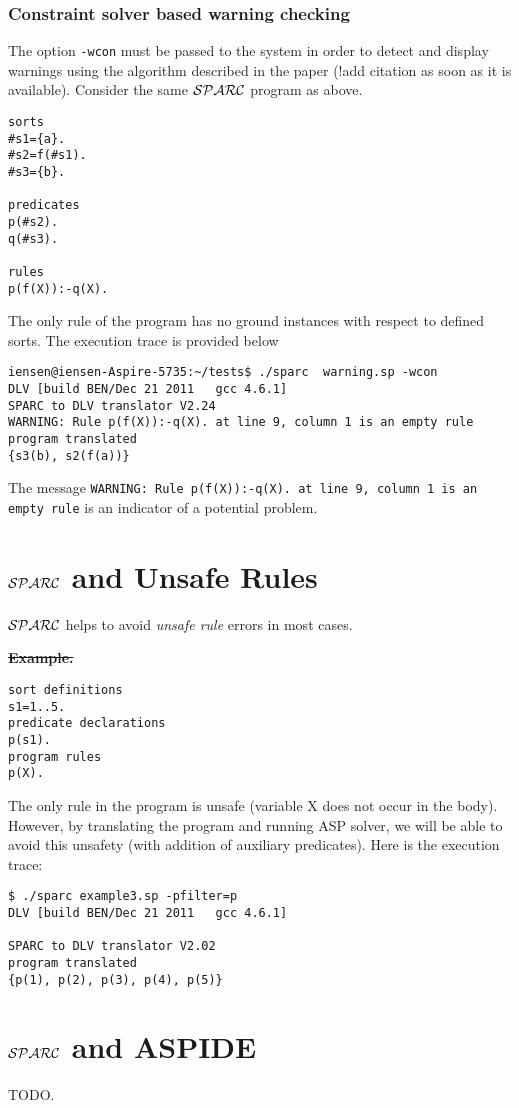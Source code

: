 \documentclass[12pt, letterpaper]{article}
\begin{document}
\subsubsection{Constraint solver based warning checking}

The option \texttt{-wcon} must be passed to the  system  in order to detect and display warnings using the algorithm described in the paper \cite{?} (!add citation as soon as it is available).
Consider the same ${\cal SPARC}$ program as above.

\begin{verbatim}
sorts
#s1={a}.
#s2=f(#s1).
#s3={b}.

predicates
p(#s2).
q(#s3).

rules
p(f(X)):-q(X).
\end{verbatim}

The only rule of the program has no ground instances with respect to defined sorts.
The execution trace is provided below
\begin{verbatim}
iensen@iensen-Aspire-5735:~/tests$ ./sparc  warning.sp -wcon
DLV [build BEN/Dec 21 2011   gcc 4.6.1]
SPARC to DLV translator V2.24
WARNING: Rule p(f(X)):-q(X). at line 9, column 1 is an empty rule
program translated
{s3(b), s2(f(a))}
\end{verbatim}

The message \texttt{WARNING: Rule p(f(X)):-q(X). at line 9, column 1 is an empty rule} is an indicator of a potential problem.

\section{${\cal SPARC}$ and Unsafe Rules}

${\cal SPARC}$ helps to avoid \textit{unsafe rule} errors in most  cases.

\st \textbf{Example.}
\begin{verbatim}
sort definitions
s1=1..5.
predicate declarations
p(s1).
program rules
p(X). 
\end{verbatim}
The only rule in the program is unsafe (variable X does not occur in the body).
However, by translating the program and running ASP solver, we will be able to avoid this unsafety 
(with addition of auxiliary predicates).
Here is the execution trace:
\begin{verbatim}
$ ./sparc example3.sp -pfilter=p 
DLV [build BEN/Dec 21 2011   gcc 4.6.1]

SPARC to DLV translator V2.02
program translated
{p(1), p(2), p(3), p(4), p(5)}
\end{verbatim}
\section{${\cal SPARC}$ and ASPIDE}
TODO. 


\end{document}
